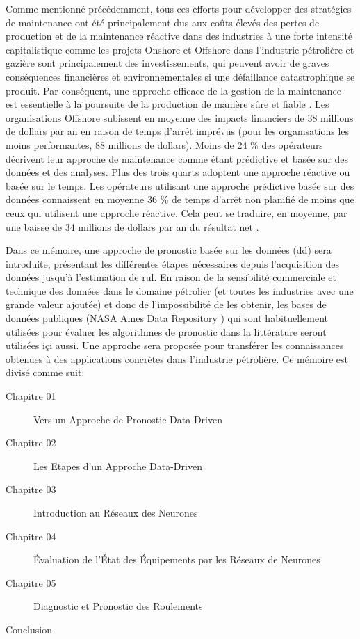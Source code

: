 Comme mentionné précédemment, tous ces efforts pour développer des stratégies de maintenance ont été principalement dus aux coûts élevés des pertes de production et de la maintenance réactive dans des industries à une forte intensité capitalistique comme les projets Onshore et Offshore dans l'industrie pétrolière et gazière sont principalement des investissements, qui peuvent avoir de graves conséquences financières et environnementales si une défaillance catastrophique se produit. Par conséquent, une approche efficace de la gestion de la maintenance est essentielle à la poursuite de la production de manière sûre et fiable \cite{Telford2011}. Les organisations Offshore subissent en moyenne des impacts financiers de 38 millions de dollars par an en raison de temps d'arrêt imprévus (pour les organisations les moins performantes, 88 millions de dollars). Moins de 24 \% des opérateurs décrivent leur approche de maintenance comme étant prédictive et basée sur des données et des analyses. Plus des trois quarts adoptent une approche réactive ou basée sur le temps. Les opérateurs utilisant une approche prédictive basée sur des données connaissent en moyenne 36 \% de temps d'arrêt non planifié de moins que ceux qui utilisent une approche réactive. Cela peut se traduire, en moyenne, par une baisse de 34 millions de dollars par an du résultat net \cite{Eriksen2016}.

Dans ce mémoire, une approche de pronostic basée sur les données (\acrlong{dd}) sera introduite, présentant les différentes étapes nécessaires depuis l'acquisition des données jusqu'à l'estimation de \acrshort{rul}. En raison de la sensibilité commerciale et technique des données dans le domaine pétrolier (et toutes les industries avec une grande valeur ajoutée) et donc de l'impossibilité de les obtenir, les bases de données publiques (NASA Ames Data Repository \cite{NASAAmes}) qui sont habituellement utilisées pour évaluer les algorithmes de pronostic dans la littérature seront utilisées içi aussi. Une approche sera proposée pour transférer les connaissances obtenues à des applications concrètes dans l'industrie pétrolière.
\newline
Ce mémoire est divisé comme suit:
\begin{description}
	\item[Chapitre 01] Vers un Approche de Pronostic Data-Driven
	\item[Chapitre 02] Les Etapes d'un Approche Data-Driven
	\item[Chapitre 03] Introduction au Réseaux des Neurones  
	\item[Chapitre 04] Évaluation de l'État des Équipements par les Réseaux de Neurones
	\item[Chapitre 05] Diagnostic et Pronostic des Roulements
	\item[Conclusion] 
\end{description}




